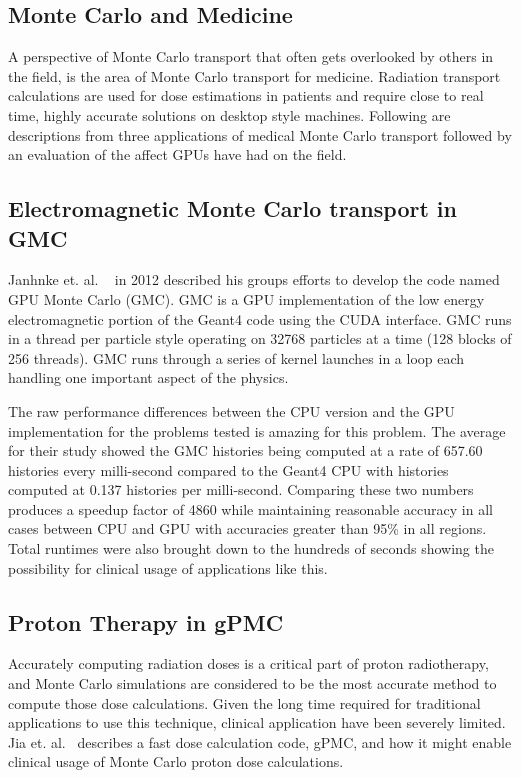 \subsection{\textbf{Monte Carlo and Medicine}}

A perspective of Monte Carlo transport that often gets overlooked by others in the field, is the area of Monte Carlo transport for medicine.
%
Radiation transport calculations are used for dose estimations in patients and require close to real time, highly accurate solutions on desktop style machines.
%
Following are descriptions from three applications of medical Monte Carlo transport followed by an evaluation of the affect GPUs have had on the field.

\subsection*{ Electromagnetic Monte Carlo transport in GMC}

Janhnke et. al. ~\cite{jahnke2012gmc} in 2012 described his groups efforts to develop the code named GPU Monte Carlo (GMC).
%
GMC is a GPU implementation of the low energy electromagnetic portion of the Geant4 code using the CUDA interface.
%
GMC runs in a thread per particle style operating on 32768 particles at a time (128 blocks of 256 threads).
%
GMC runs through a series of kernel launches in a loop each handling one important aspect of the physics.

The raw performance differences between the CPU version and the GPU implementation for the problems tested is amazing for this problem.
%
The average for their study showed the GMC histories being computed at a rate of 657.60 histories every milli-second compared to the Geant4 CPU with histories computed at 0.137 histories per milli-second.
%
Comparing these two numbers produces a speedup factor of 4860 while maintaining reasonable accuracy in all cases between CPU and GPU with accuracies greater than 95\% in all regions.
%
Total runtimes were also brought down to the hundreds of seconds showing the possibility for clinical usage of applications like this.~\cite{jahnke2012gmc}

\subsection*{ Proton Therapy in gPMC}

Accurately computing radiation doses is a critical part of proton radiotherapy, and Monte Carlo simulations are considered to be the most accurate method to compute those dose calculations.
%
Given the long time required for traditional applications to use this technique, clinical application have been severely limited.
%
Jia et. al.~\cite{jia2012gpu} describes a fast dose calculation code, gPMC, and how it might enable clinical usage of Monte Carlo proton dose calculations.

